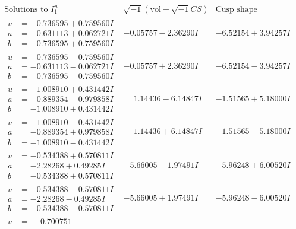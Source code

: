 \documentclass[1p]{elsarticle_modified}
\theoremstyle{definition}
\newcommand{\I}{\sqrt{-1}}
\begin{document}
$$\begin{array}{c|c|c}  
\text{Solutions to }I^u_{1}& \I (\text{vol} + \sqrt{-1}CS) & \text{Cusp shape}\\
 \hline 
\begin{aligned}
u &= -0.736595 + 0.759560 I \\
a &= -0.631113 + 0.062721 I \\
b &= -0.736595 + 0.759560 I\end{aligned}
 & -0.05757 - 2.36290 I & -6.52154 + 3.94257 I \\ \hline\begin{aligned}
u &= -0.736595 - 0.759560 I \\
a &= -0.631113 - 0.062721 I \\
b &= -0.736595 - 0.759560 I\end{aligned}
 & -0.05757 + 2.36290 I & -6.52154 - 3.94257 I \\ \hline\begin{aligned}
u &= -1.008910 + 0.431442 I \\
a &= -0.889354 - 0.979858 I \\
b &= -1.008910 + 0.431442 I\end{aligned}
 & \phantom{-}1.14436 - 6.14847 I & -1.51565 + 5.18000 I \\ \hline\begin{aligned}
u &= -1.008910 - 0.431442 I \\
a &= -0.889354 + 0.979858 I \\
b &= -1.008910 - 0.431442 I\end{aligned}
 & \phantom{-}1.14436 + 6.14847 I & -1.51565 - 5.18000 I \\ \hline\begin{aligned}
u &= -0.534388 + 0.570811 I \\
a &= -2.28268 + 0.49285 I \\
b &= -0.534388 + 0.570811 I\end{aligned}
 & -5.66005 - 1.97491 I & -5.96248 + 6.00520 I \\ \hline\begin{aligned}
u &= -0.534388 - 0.570811 I \\
a &= -2.28268 - 0.49285 I \\
b &= -0.534388 - 0.570811 I\end{aligned}
 & -5.66005 + 1.97491 I & -5.96248 - 6.00520 I \\ \hline\begin{aligned}
u &= \phantom{-}0.700751\phantom{ +0.000000I} \\

\end{aligned}
\end{array}$$
\end{document}
